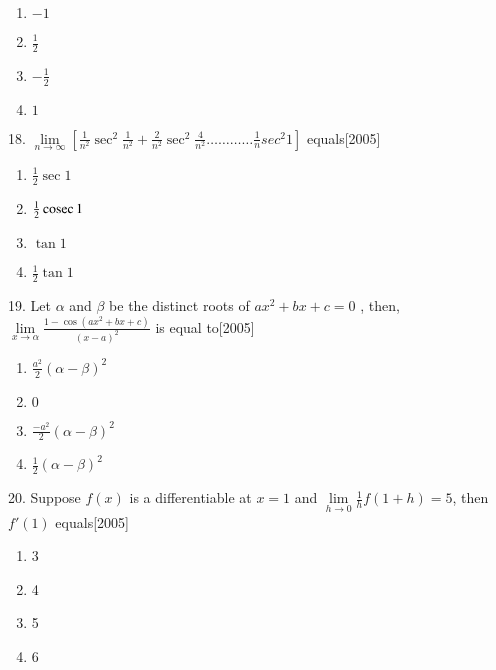 \documentclass[journal,12pt,twocolumn]{IEEEtran}
\theoremstyle{remark}
\begin{document}
\begin{enumerate}
    \item $-1$
    \item $\frac{1}{2}$
    \item $-\frac{1}{2}$
    \item $1$\\[2pt]
\end{enumerate}

18. $\displaystyle\lim\limits_{n\to\infty}\left[\frac{1}{n^2}\sec^2\frac{1}{n^2}+\frac{2}{n^2}\sec^2\frac{4}{n^2}\dots\dots\dots\dots\frac{1}{n}sec^2 1\right]$ equals\hfill[2005]

\begin{enumerate}
    \item $\frac{1}{2}\sec 1$
    \item $\frac{1}{2}\,\text{cosec}\, 1$
    \item $\tan 1$
    \item $\frac{1}{2} \tan 1$\\[2pt]
\end{enumerate}

19. Let $\alpha$ and $\beta$ be the distinct roots of $ax^2+bx+c=0$ , then, $\displaystyle\lim\limits_{x\to\alpha}\frac{1-\cos(ax^2+bx+c)}{(x-a)^2}$ is equal to\hfill[2005]

\begin{enumerate}
    \item $\frac{a^2}{2}(\alpha-\beta)^2$
    \item $0$
    \item $\frac{-a^2}{2}(\alpha-\beta)^2$
    \item $\frac{1}{2}(\alpha-\beta)^2$\\[2pt]
\end{enumerate}

20. Suppose $f(x)$ is a differentiable at $x=1$ and $\lim\limits_{h\to 0}\frac{1}{h}f(1+h)=5$, then $f'(1)$ equals\hfill[2005]

\begin{enumerate}
    \item 3
    \item 4
    \item 5
    \item 6
\end{enumerate}
 
\end{document}
